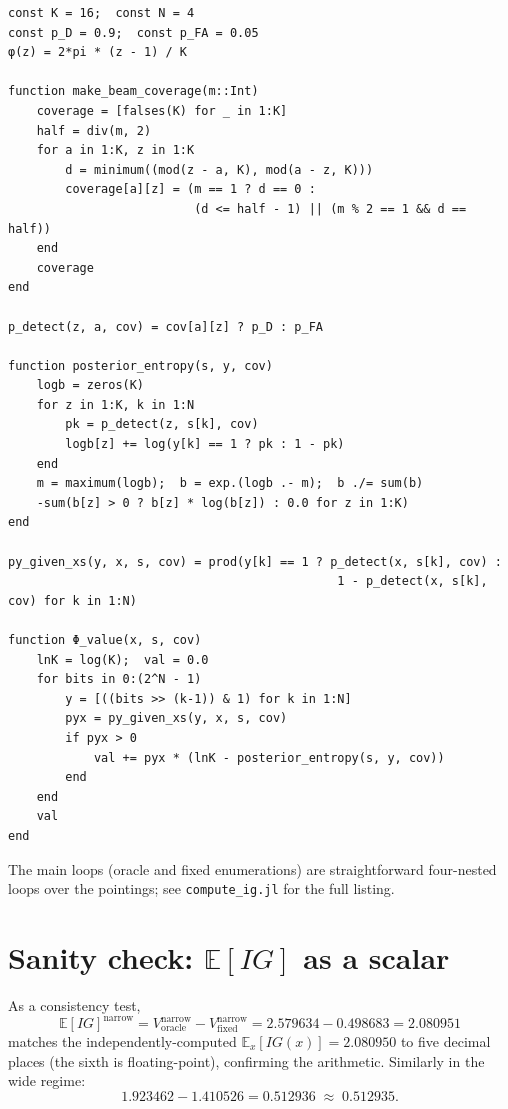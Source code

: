 \documentclass[11pt,a4paper]{article}
\newcommand{\E}{\mathbb{E}}
\begin{document}
\begin{lstlisting}
const K = 16;  const N = 4
const p_D = 0.9;  const p_FA = 0.05
φ(z) = 2*pi * (z - 1) / K

function make_beam_coverage(m::Int)
    coverage = [falses(K) for _ in 1:K]
    half = div(m, 2)
    for a in 1:K, z in 1:K
        d = minimum((mod(z - a, K), mod(a - z, K)))
        coverage[a][z] = (m == 1 ? d == 0 :
                          (d <= half - 1) || (m % 2 == 1 && d == half))
    end
    coverage
end

p_detect(z, a, cov) = cov[a][z] ? p_D : p_FA

function posterior_entropy(s, y, cov)
    logb = zeros(K)
    for z in 1:K, k in 1:N
        pk = p_detect(z, s[k], cov)
        logb[z] += log(y[k] == 1 ? pk : 1 - pk)
    end
    m = maximum(logb);  b = exp.(logb .- m);  b ./= sum(b)
    -sum(b[z] > 0 ? b[z] * log(b[z]) : 0.0 for z in 1:K)
end

py_given_xs(y, x, s, cov) = prod(y[k] == 1 ? p_detect(x, s[k], cov) :
                                              1 - p_detect(x, s[k], cov) for k in 1:N)

function Φ_value(x, s, cov)
    lnK = log(K);  val = 0.0
    for bits in 0:(2^N - 1)
        y = [((bits >> (k-1)) & 1) for k in 1:N]
        pyx = py_given_xs(y, x, s, cov)
        if pyx > 0
            val += pyx * (lnK - posterior_entropy(s, y, cov))
        end
    end
    val
end
\end{lstlisting}

The main loops (oracle and fixed enumerations) are straightforward four-nested loops over the pointings; see \texttt{compute\_ig.jl} for the full listing.

\section{Sanity check: $\E[IG]$ as a scalar}
As a consistency test,
\[
  \E[IG]^{\text{narrow}} = V_{\text{oracle}}^{\text{narrow}} - V_{\text{fixed}}^{\text{narrow}}
  = 2.579634 - 0.498683 = 2.080951
\]
matches the independently-computed $\E_x[IG(x)] = 2.080950$ to five decimal places (the sixth is floating-point), confirming the arithmetic.  Similarly in the wide regime:
\[
  1.923462 - 1.410526 = 0.512936 \;\approx\; 0.512935.
\]
\end{document}
